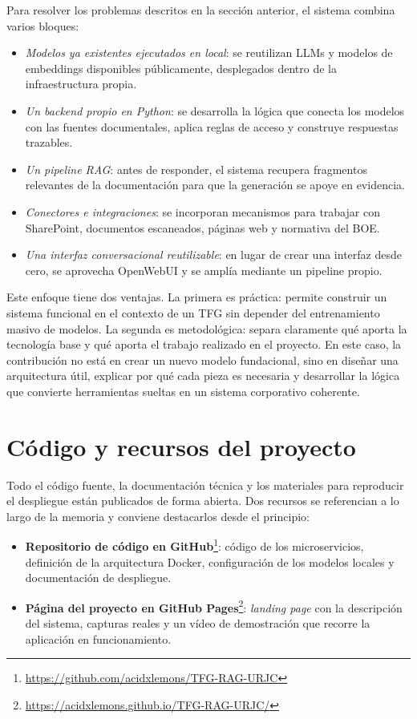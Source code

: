 Para resolver los problemas descritos en la sección anterior, el sistema combina varios bloques:

\begin{itemize}
    \item \textit{Modelos ya existentes ejecutados en local}: se reutilizan LLMs y modelos de embeddings disponibles públicamente, desplegados dentro de la infraestructura propia.
    \item \textit{Un backend propio en Python}: se desarrolla la lógica que conecta los modelos con las fuentes documentales, aplica reglas de acceso y construye respuestas trazables.
    \item \textit{Un pipeline RAG}: antes de responder, el sistema recupera fragmentos relevantes de la documentación para que la generación se apoye en evidencia.
    \item \textit{Conectores e integraciones}: se incorporan mecanismos para trabajar con SharePoint, documentos escaneados, páginas web y normativa del BOE.
    \item \textit{Una interfaz conversacional reutilizable}: en lugar de crear una interfaz desde cero, se aprovecha OpenWebUI y se amplía mediante un pipeline propio.
\end{itemize}

Este enfoque tiene dos ventajas. La primera es práctica: permite construir un sistema funcional en el contexto de un TFG sin depender del entrenamiento masivo de modelos. La segunda es metodológica: separa claramente qué aporta la tecnología base y qué aporta el trabajo realizado en el proyecto. En este caso, la contribución no está en crear un nuevo modelo fundacional, sino en diseñar una arquitectura útil, explicar por qué cada pieza es necesaria y desarrollar la lógica que convierte herramientas sueltas en un sistema corporativo coherente.

\section{Código y recursos del proyecto}
\label{sec:codigo-proyecto}

Todo el código fuente, la documentación técnica y los materiales para reproducir el despliegue están publicados de forma abierta. Dos recursos se referencian a lo largo de la memoria y conviene destacarlos desde el principio:

\begin{itemize}
    \item \textbf{Repositorio de código en GitHub}\footnote{\url{https://github.com/acidxlemons/TFG-RAG-URJC}}: código de los microservicios, definición de la arquitectura Docker, configuración de los modelos locales y documentación de despliegue.
    \item \textbf{Página del proyecto en GitHub Pages}\footnote{\url{https://acidxlemons.github.io/TFG-RAG-URJC/}}: \textit{landing page} con la descripción del sistema, capturas reales y un vídeo de demostración que recorre la aplicación en funcionamiento.
\end{itemize}

